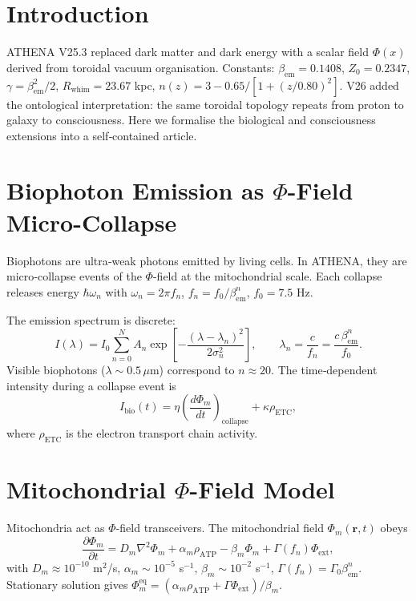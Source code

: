 \documentclass[11pt]{article}
\newcommand{\bem}{\beta_{\mathrm{em}}}
\newcommand{\Zzero}{Z_{0}}
\newcommand{\Rwhim}{R_{\mathrm{whim}}}
\begin{document}
\tableofcontents

\newpage

\section{Introduction}
\label{sec:intro}

ATHENA V25.3 replaced dark matter and dark energy with a scalar field $\Phi(x)$ derived from toroidal vacuum organisation. Constants: $\bem=0.1408$, $\Zzero=0.2347$, $\gamma=\bem^2/2$, $\Rwhim=23.67$ kpc, $n(z)=3-0.65/[1+(z/0.80)^2]$. V26 added the ontological interpretation: the same toroidal topology repeats from proton to galaxy to consciousness. Here we formalise the biological and consciousness extensions into a self‑contained article.

\section{Biophoton Emission as $\Phi$-Field Micro-Collapse}
\label{sec:biophoton}

Biophotons are ultra‑weak photons emitted by living cells. In ATHENA, they are micro‑collapse events of the $\Phi$-field at the mitochondrial scale. Each collapse releases energy $\hbar\omega_n$ with $\omega_n = 2\pi f_n$, $f_n = f_0/\bem^n$, $f_0=7.5$ Hz.

The emission spectrum is discrete:
\begin{equation}
I(\lambda) = I_0 \sum_{n=0}^{N} A_n \exp\left[-\frac{(\lambda-\lambda_n)^2}{2\sigma_n^2}\right],\qquad 
\lambda_n = \frac{c}{f_n} = \frac{c\,\bem^{n}}{f_0}.
\label{eq:biophoton_spectrum}
\end{equation}
Visible biophotons ($\lambda\sim0.5$ $\mu$m) correspond to $n\approx20$. The time‑dependent intensity during a collapse event is
\begin{equation}
I_{\mathrm{bio}}(t) = \eta \left(\frac{d\Phi_m}{dt}\right)_{\mathrm{collapse}} + \kappa \rho_{\mathrm{ETC}},
\label{eq:biophoton_time}
\end{equation}
where $\rho_{\mathrm{ETC}}$ is the electron transport chain activity.

\section{Mitochondrial $\Phi$-Field Model}
\label{sec:mito}

Mitochondria act as $\Phi$-field transceivers. The mitochondrial field $\Phi_m(\mathbf{r},t)$ obeys
\begin{equation}
\frac{\partial \Phi_m}{\partial t} = D_m \nabla^2 \Phi_m + \alpha_m \rho_{\mathrm{ATP}} - \beta_m \Phi_m + \Gamma(f_n) \Phi_{\mathrm{ext}},
\label{eq:mito_phi}
\end{equation}
with $D_m\approx10^{-10}$ m$^2$/s, $\alpha_m\sim10^{-5}$ s$^{-1}$, $\beta_m\sim10^{-2}$ s$^{-1}$, $\Gamma(f_n)=\Gamma_0\bem^{n}$. Stationary solution gives $\Phi_m^{\mathrm{eq}} = (\alpha_m\rho_{\mathrm{ATP}} + \Gamma\Phi_{\mathrm{ext}})/\beta_m$.
\end{document}
